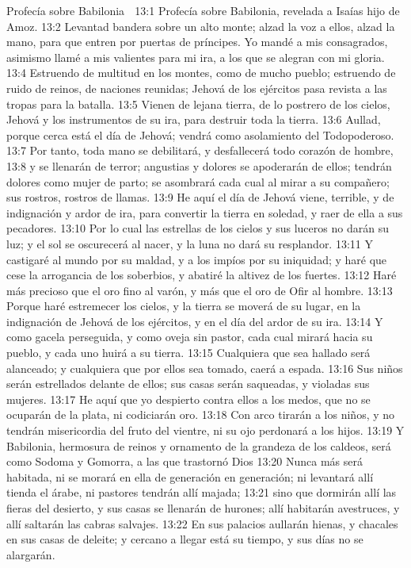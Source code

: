 Profecía sobre Babilonia  

13:1 Profecía sobre Babilonia, revelada a Isaías hijo de Amoz.  
13:2 Levantad bandera sobre un alto monte; alzad la voz a ellos, alzad la mano, para que entren por puertas de príncipes. Yo mandé a mis consagrados, asimismo llamé a mis valientes para mi ira, a los que se alegran con mi gloria.  
13:4 Estruendo de multitud en los montes, como de mucho pueblo; estruendo de ruido de reinos, de naciones reunidas; Jehová de los ejércitos pasa revista a las tropas para la batalla.  
13:5 Vienen de lejana tierra, de lo postrero de los cielos, Jehová y los instrumentos de su ira, para destruir toda la tierra.  
13:6 Aullad, porque cerca está el día de Jehová; vendrá como asolamiento del Todopoderoso. 
13:7 Por tanto, toda mano se debilitará, y desfallecerá todo corazón de hombre,  
13:8 y se llenarán de terror; angustias y dolores se apoderarán de ellos; tendrán dolores como mujer de parto; se asombrará cada cual al mirar a su compañero; sus rostros, rostros de llamas.  
13:9 He aquí el día de Jehová viene, terrible, y de indignación y ardor de ira, para convertir la tierra en soledad, y raer de ella a sus pecadores.  
13:10 Por lo cual las estrellas de los cielos y sus luceros no darán su luz; y el sol se oscurecerá al nacer, y la luna no dará su resplandor. 
13:11 Y castigaré al mundo por su maldad, y a los impíos por su iniquidad; y haré que cese la arrogancia de los soberbios, y abatiré la altivez de los fuertes.  
13:12 Haré más precioso que el oro fino al varón, y más que el oro de Ofir al hombre.  
13:13 Porque haré estremecer los cielos, y la tierra se moverá de su lugar, en la indignación de Jehová de los ejércitos, y en el día del ardor de su ira.  
13:14 Y como gacela perseguida, y como oveja sin pastor, cada cual mirará hacia su pueblo, y cada uno huirá a su tierra.  
13:15 Cualquiera que sea hallado será alanceado; y cualquiera que por ellos sea tomado, caerá a espada.  
13:16 Sus niños serán estrellados delante de ellos; sus casas serán saqueadas, y violadas sus mujeres.  
13:17 He aquí que yo despierto contra ellos a los medos, que no se ocuparán de la plata, ni codiciarán oro.  
13:18 Con arco tirarán a los niños, y no tendrán misericordia del fruto del vientre, ni su ojo perdonará a los hijos.  
13:19 Y Babilonia, hermosura de reinos y ornamento de la grandeza de los caldeos, será como Sodoma y Gomorra, a las que trastornó Dios 
13:20 Nunca más será habitada, ni se morará en ella de generación en generación; ni levantará allí tienda el árabe, ni pastores tendrán allí majada;  
13:21 sino que dormirán allí las fieras del desierto, y sus casas se llenarán de hurones; allí habitarán avestruces, y allí saltarán las cabras salvajes.  
13:22 En sus palacios aullarán hienas, y chacales en sus casas de deleite; y cercano a llegar está su tiempo, y sus días no se alargarán.  

